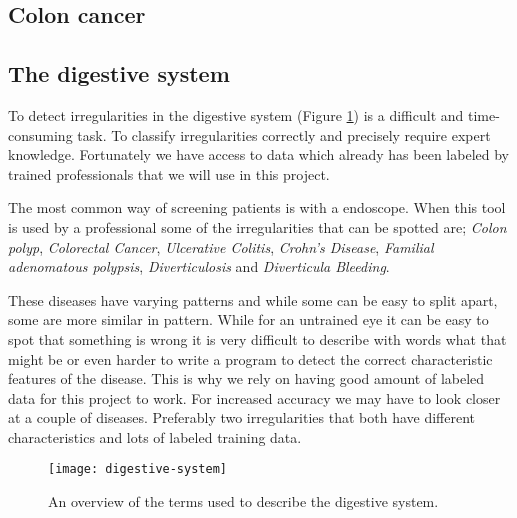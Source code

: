 \documentclass[thesis.tex]{subfiles}
\begin{document}
\subsection{Colon cancer} \label{sec:colon_cancer}


\subsection{The digestive system}  \label{sec:the_digestive_system}
To detect irregularities in the digestive system (Figure \ref{fig:digestive_system}) is a difficult and time-consuming task. To classify irregularities correctly and precisely require expert knowledge. Fortunately we have access to data which already has been labeled by trained professionals that we will use in this project.

The most common way of screening patients is with a endoscope. When this tool is used by a professional some of the irregularities that can be spotted are; \textit{Colon polyp}, \textit{Colorectal Cancer}, \textit{Ulcerative Colitis}, \textit{Crohn's Disease}, \textit{Familial adenomatous polypsis}, \textit{Diverticulosis} and \textit{Diverticula Bleeding}. 

These diseases have varying patterns and while some can be easy to split apart, some are more similar in pattern. While for an untrained eye it can be easy to spot that something is wrong it is very difficult to describe with words what that might be or even harder to write a program to detect the correct characteristic features of the disease. This is why we rely on having good amount of labeled data for this project to work. For increased accuracy we may have to look closer at a couple of diseases. Preferably two irregularities that both have different characteristics and lots of labeled training data.

\begin{figure}[ht] %
  \begin{center}
    \texttt{[image: digestive-system]}
    \caption[An overview of the terms used to describe the digestive system]{An overview of the terms used to describe the digestive system\footnotemark.}
    \label{fig:digestive_system}
  \end{center}
\end{figure}
\end{document}

